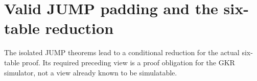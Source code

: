 \section{Valid JUMP padding and the six-table reduction}\label{sec:tables}

The isolated JUMP theorems lead to a conditional reduction for the actual six-table proof. Its required preceding view is a proof obligation for the GKR simulator, not a view already known to be simulatable.






